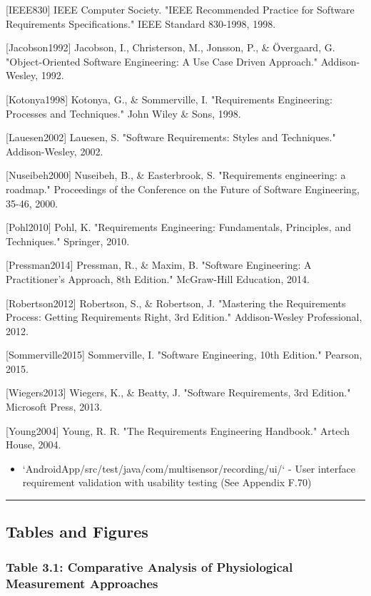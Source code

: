 \documentclass[12pt,a4paper]{article}
\begin{document}
[IEEE830] IEEE Computer Society. "IEEE Recommended Practice for Software Requirements Specifications." IEEE Standard
830-1998, 1998.

[Jacobson1992] Jacobson, I., Christerson, M., Jonsson, P., \& Övergaard, G. "Object-Oriented Software Engineering: A Use
Case Driven Approach." Addison-Wesley, 1992.

[Kotonya1998] Kotonya, G., \& Sommerville, I. "Requirements Engineering: Processes and Techniques." John Wiley \& Sons,
1998.

[Lauesen2002] Lauesen, S. "Software Requirements: Styles and Techniques." Addison-Wesley, 2002.

[Nuseibeh2000] Nuseibeh, B., \& Easterbrook, S. "Requirements engineering: a roadmap." Proceedings of the Conference on
the Future of Software Engineering, 35-46, 2000.

[Pohl2010] Pohl, K. "Requirements Engineering: Fundamentals, Principles, and Techniques." Springer, 2010.

[Pressman2014] Pressman, R., \& Maxim, B. "Software Engineering: A Practitioner's Approach, 8th Edition." McGraw-Hill
Education, 2014.

[Robertson2012] Robertson, S., \& Robertson, J. "Mastering the Requirements Process: Getting Requirements Right, 3rd
Edition." Addison-Wesley Professional, 2012.

[Sommerville2015] Sommerville, I. "Software Engineering, 10th Edition." Pearson, 2015.

[Wiegers2013] Wiegers, K., \& Beatty, J. "Software Requirements, 3rd Edition." Microsoft Press, 2013.

[Young2004] Young, R. R. "The Requirements Engineering Handbook." Artech House, 2004.

\begin{itemize}
\item `AndroidApp/src/test/java/com/multisensor/recording/ui/` - User interface requirement validation with usability
  testing (See Appendix F.70)

\end{itemize}
\hrule

\subsection{Tables and Figures}

\subsubsection{Table 3.1: Comparative Analysis of Physiological Measurement Approaches}
\end{document}
